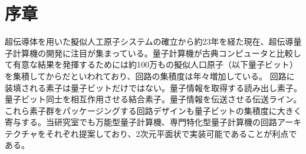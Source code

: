 \section*{序章}
超伝導体を用いた擬似人工原子システムの確立\cite*{nakamura1999coherent}から約23年を経た現在、超伝導量子計算機の開発に注目が集まっている。量子計算機が古典コンピュータと比較して有意な結果を発揮するためには約100万もの擬似人口原子（以下量子ビット）を集積してからだといわれており、回路の集積度は年々増加している。
回路に装填される素子は量子ビットだけではない。量子情報を取得する読み出し素子。量子ビット同士を相互作用させる結合素子。量子情報を伝送させる伝送ライン。これら素子群をパッケージングする回路デザインも量子ビットの集積度に大きく寄与する。当研究室でも万能型量子計算機、専門特化型量子計算機の回路アーキテクチャをそれぞれ提案しており、2次元平面状で実装可能であることが利点である。